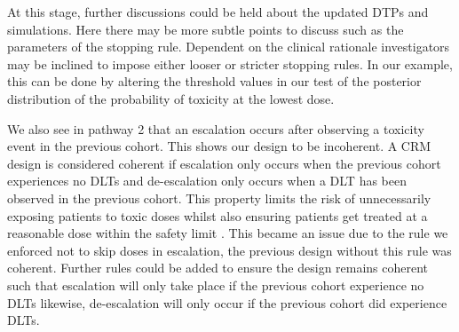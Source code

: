 At this stage, further discussions could be held about the updated DTPs and simulations. Here there may be more subtle points to discuss such as the parameters of the stopping rule. Dependent on the clinical rationale investigators may be inclined to impose either looser or stricter stopping rules. In our example, this can be done by altering the threshold values in our test of the posterior distribution of the probability of toxicity at the lowest dose. 

We also see in pathway 2 that an escalation occurs after observing a toxicity event in the previous cohort. This shows our design to be incoherent. A CRM design is considered coherent if escalation only occurs when the previous cohort experiences no DLTs and de-escalation only occurs when a DLT has been observed in the previous cohort. This property limits the risk of unnecessarily exposing patients to toxic doses whilst also ensuring patients get treated at a reasonable dose within the safety limit \cite{cheungDoseFindingContinual2011}. This became an issue due to the rule we enforced not to skip doses in escalation, the previous design without this rule was coherent. Further rules could be added to ensure the design remains coherent such that escalation will only take place if the previous cohort experience no DLTs likewise, de-escalation will only occur if the previous cohort did experience DLTs. 

